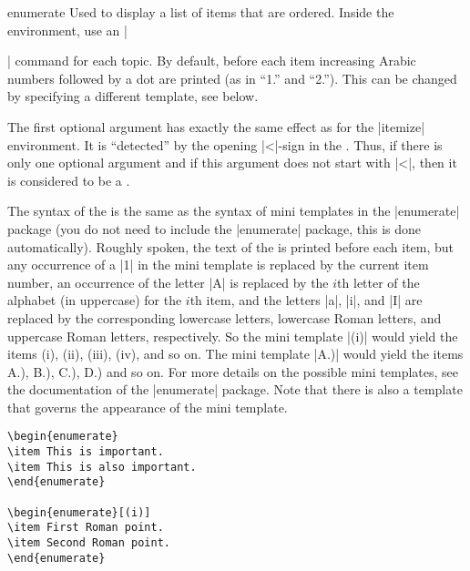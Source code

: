 \begin{environment}{{enumerate}} 
  Used to display a list of items that are ordered.  Inside the
  environment, use an |\item| command for each topic. By default,
  before each item increasing Arabic numbers  followed by a dot are
  printed (as in ``1.'' and ``2.''). This can be changed by specifying
  a different template,  see below.

  The first optional argument  has
  exactly the same effect as for the |itemize| environment. It is
  ``detected'' by the opening |<|-sign in the . Thus, if there is only one optional argument and
  if this argument does not start with |<|, then it is considered to
  be a . 

  The syntax of the  is the same as
  the syntax of mini templates in the |enumerate| package (you do not
  need to include the 
  |enumerate| package, this is done automatically). Roughly spoken,
  the text of the  is printed before each item,
  but any occurrence of a |1| in the mini template is replaced by the
  current item number, an occurrence of the letter |A| is replaced by
  the $i$th letter of the alphabet (in uppercase) for the $i$th item,
  and the letters |a|, |i|, and |I| are replaced by the corresponding
  lowercase letters, lowercase Roman letters, and uppercase Roman
  letters, respectively. So the mini template |(i)| would yield the
  items (i), (ii), (iii), (iv), and so on. The mini template |A.)|
  would yield the items A.), B.), C.), D.) and so on. For more details
  on the possible mini templates, see the documentation of the
  |enumerate| package. Note that there is also a template that governs
  the appearance of the mini template.
  
  \example
\begin{verbatim}
\begin{enumerate}
\item This is important.
\item This is also important.
\end{enumerate}

\begin{enumerate}[(i)]
\item First Roman point.
\item Second Roman point.
\end{enumerate}


\end{verbatim}
\end{environment}
